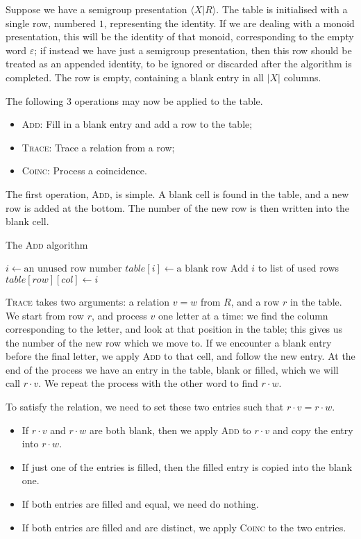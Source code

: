 Suppose we have a semigroup presentation $\langle X | R \rangle$.  The table is
initialised with a single row, numbered $1$, representing the identity.  If we
are dealing with a monoid presentation, this will be the identity of that
monoid, corresponding to the empty word $\varepsilon$; if instead we have just a
semigroup presentation, then this row should be treated as an appended identity,
to be ignored or discarded after the algorithm is completed.  The row is empty,
containing a blank entry in all $|X|$ columns.

The following 3 operations may now be applied to the table.

\begin{itemize}
\item \textsc{Add}: Fill in a blank entry and add a row to the table;
\item \textsc{Trace}: Trace a relation from a row;
\item \textsc{Coinc}: Process a coincidence.
\end{itemize}

The first operation, \textsc{Add}, is simple.  A blank cell is found in the
table, and a new row is added at the bottom.  The number of the new row is then
written into the blank cell.

\begin{algorithm}
\caption{The \textsc{Add} algorithm}\label{euclid}
\begin{algorithmic}[1]
\State $i \gets \text{an unused row number}$
\State $table[i] \gets \text{a blank row}$
\State Add $i$ to list of used rows
\State $table[row][col] \gets i$
\EndProcedure
\end{algorithmic}
\end{algorithm}

\textsc{Trace} takes two arguments: a relation $v=w$ from $R$, and a row $r$
in the table.  We start from row $r$, and process $v$ one letter at a time: we
find the column corresponding to the letter, and look at that position in the
table; this gives us the number of the new row which we move to.  If we
encounter a blank entry before the final letter, we apply \textsc{Add} to that
cell, and follow the new entry.  At the end of the process we have an entry in
the table, blank or filled, which we will call $r \cdot v$.  We repeat the
process with the other word to find $r \cdot w$.

To satisfy the relation, we need to set these two entries such that
$r \cdot v = r \cdot w$.
\begin{itemize}
\item If $r \cdot v$ and $r \cdot w$ are both blank, then we apply
  \textsc{Add} to $r \cdot v$ and copy the entry into $r \cdot w$.
\item If just one of the entries is filled, then the filled entry is copied into
  the blank one.
\item If both entries are filled and equal, we need do nothing.
\item If both entries are filled and are distinct, we apply \textsc{Coinc} to
  the two entries.
\end{itemize}

